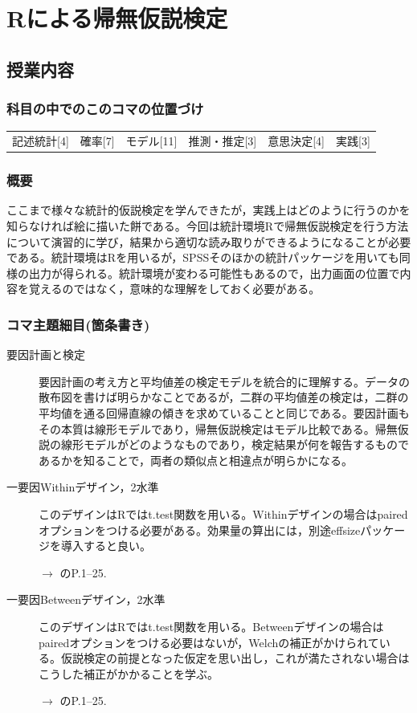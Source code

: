 \section{Rによる帰無仮説検定}
\label{lesson20}

\subsection{授業内容}
\subsubsection{科目の中でのこのコマの位置づけ}
\begin{tabular}[t]{cccccc}
    記述統計[4] & 確率[7] & モデル[11] & 推測・推定[3] & 意思決定[4] & 実践[3]
\end{tabular}

\subsubsection{概要}
ここまで様々な統計的仮説検定を学んできたが，実践上はどのように行うのかを知らなければ絵に描いた餅である。今回は統計環境Rで帰無仮説検定を行う方法について演習的に学び，結果から適切な読み取りができるようになることが必要である。統計環境はRを用いるが，SPSSそのほかの統計パッケージを用いても同様の出力が得られる。統計環境が変わる可能性もあるので，出力画面の位置で内容を覚えるのではなく，意味的な理解をしておく必要がある。
\subsubsection{コマ主題細目(箇条書き)}
\begin{description}


    \item[要因計画と検定]要因計画の考え方と平均値差の検定モデルを統合的に理解する。データの散布図を書けば明らかなことであるが，二群の平均値差の検定は，二群の平均値を通る回帰直線の傾きを求めていることと同じである。要因計画もその本質は線形モデルであり，帰無仮説検定はモデル比較である。帰無仮説の線形モデルがどのようなものであり，検定結果が何を報告するものであるかを知ることで，両者の類似点と相違点が明らかになる。

\item[一要因Withinデザイン，2水準]このデザインはRではt.test関数を用いる。Withinデザインの場合はpairedオプションをつける必要がある。効果量の算出には，別途effsizeパッケージを導入すると良い。
\begin{flushright}
    $\to$ \citet{橋本201607}のP.1--25.
\end{flushright}

\item[一要因Betweenデザイン，2水準]このデザインはRではt.test関数を用いる。Betweenデザインの場合はpairedオプションをつける必要はないが，Welchの補正がかけられている。仮説検定の前提となった仮定を思い出し，これが満たされない場合はこうした補正がかかることを学ぶ。
\begin{flushright}
    $\to$ \citet{橋本201607}のP.1--25.
\end{flushright}

\end{description}
